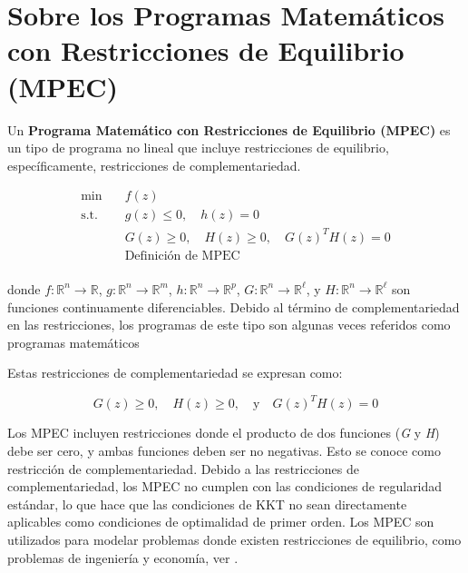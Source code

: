 \section{Sobre los Programas Matemáticos con Restricciones de Equilibrio (MPEC)}
Un \textbf{Programa Matemático con Restricciones de Equilibrio (MPEC)} es un tipo de programa no lineal que incluye restricciones de equilibrio, específicamente, restricciones de complementariedad.

\begin{equation}
\begin{aligned}
\min \quad & f(z)  \\
\text{s.t.} \quad & g(z) \leq 0, \quad h(z) = 0 \\
& G(z) \geq 0, \quad H(z) \geq 0, \quad G(z)^T H(z) = 0 \\
&\text{Definición de MPEC} \\
\end{aligned}  
\label{eq:DefMpec}
\end{equation}

donde $f: \mathbb{R}^n \to \mathbb{R}$, $g: \mathbb{R}^n \to \mathbb{R}^m$, $h: \mathbb{R}^n \to \mathbb{R}^p$, $G: \mathbb{R}^n \to \mathbb{R}^\ell$, y $H: \mathbb{R}^n \to \mathbb{R}^\ell$ son funciones continuamente diferenciables. Debido al término de complementariedad en las restricciones, los programas de este tipo son algunas veces referidos como programas matemáticos

Estas restricciones de complementariedad se expresan como: 

\begin{equation}
    G(z) \geq 0, \quad H(z) \geq 0, \quad \text{y} \quad G(z)^T H(z) = 0 \label{eq:RestriccionesComplementariedadAbstracto}
\end{equation}

Los MPEC incluyen restricciones donde el producto de dos funciones (\textit{G} y \textit{H}) debe ser cero, y ambas funciones deben ser no negativas. Esto se conoce como restricción de complementariedad. Debido a las restricciones de complementariedad, los MPEC no cumplen con las condiciones de regularidad estándar, lo que hace que las condiciones de KKT no sean directamente aplicables como condiciones de optimalidad de primer orden. Los MPEC son utilizados para modelar problemas donde existen restricciones de equilibrio, como problemas de ingeniería y economía, ver \cite{Flegel2003AFJ,DempeyZemkoho2020}.


